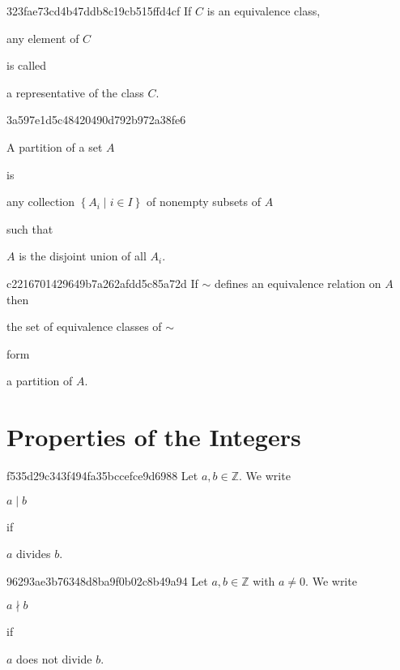 \begin{note}{323fae73cd4b47ddb8c19cb515ffd4cf}
    If \({ C }\) is an equivalence class, \begin{icloze}{2}any element of \({ C }\)\end{icloze} is called \begin{icloze}{1}a representative of the class \({ C }\).\end{icloze}
\end{note}

\begin{note}{3a597e1d5c48420490d792b972a38fe6}
    \begin{icloze}{2}A partition of a set \({ A }\)\end{icloze} is \begin{icloze}{3}any collection \({ \left\{ A_i \mid i \in I \right\} }\) of nonempty subsets of \({ A }\)\end{icloze} such that \begin{icloze}{1}\({ A }\) is the disjoint union of all \({ A_i }\).\end{icloze}
\end{note}

\begin{note}{c2216701429649b7a262afdd5c85a72d}
    If \({ \sim }\) defines an equivalence relation on \({ A }\) then \begin{icloze}{2}the set of equivalence classes of \({ \sim }\)\end{icloze} form \begin{icloze}{1}a partition of \({ A }\).\end{icloze}
\end{note}

\section{Properties of the Integers}
\begin{note}{f535d29c343f494fa35bccefce9d6988}
    Let \({ a, b \in \mathbb Z }\).
    We write \begin{icloze}{2}\({ a \mid b }\)\end{icloze} if \begin{icloze}{1}\({ a }\) divides \({ b }\).\end{icloze}
\end{note}

\begin{note}{96293ae3b76348d8ba9f0b02c8b49a94}
    Let \({ a, b \in \mathbb Z }\) with \({ a \neq 0 }\).
    We write \begin{icloze}{2}\({ a \nmid b }\)\end{icloze} if \begin{icloze}{1}\({ a }\) does not divide \({ b }\).\end{icloze}
\end{note}

